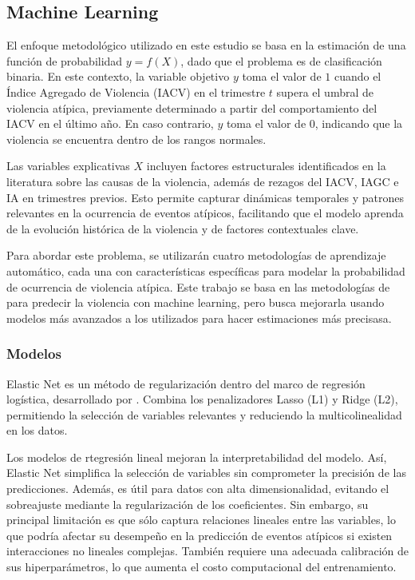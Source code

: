 \subsection*{Machine Learning}
El enfoque metodológico utilizado en este estudio se basa en la estimación de una función de probabilidad \( y = f(X) \), dado que el problema es de {clasificación binaria}. En este contexto, la variable objetivo \( y \) toma el valor de \(1\) cuando el Índice Agregado de Violencia (IACV) en el trimestre \( t \) supera el umbral de violencia atípica, previamente determinado a partir del comportamiento del IACV en el último año. En caso contrario, \( y \) toma el valor de \(0\), indicando que la violencia se encuentra dentro de los rangos normales.

Las variables explicativas \( X \) incluyen factores estructurales identificados en la literatura sobre las causas de la violencia, además de rezagos del IACV, IAGC e IA en trimestres previos. Esto permite capturar {dinámicas temporales} y patrones relevantes en la ocurrencia de eventos atípicos, facilitando que el modelo aprenda de la evolución histórica de la violencia y de factores contextuales clave.

Para abordar este problema, se utilizarán cuatro metodologías de {aprendizaje automático}, cada una con características específicas para modelar la probabilidad de ocurrencia de violencia atípica. Este trabajo se basa en las metodologías de \citet{Bazzi2022} para predecir la violencia con machine learning, pero busca mejorarla usando modelos más avanzados a los utilizados para hacer estimaciones más precisasa.

\subsubsection*{Modelos}


Elastic Net es un método de regularización dentro del marco de {regresión logística}, desarrollado por \citet{ZouHastie2005}. Combina los penalizadores {Lasso (L1)} y {Ridge (L2)}, permitiendo la selección de variables relevantes y reduciendo la multicolinealidad en los datos. 

Los modelos de rtegresión lineal mejoran la interpretabilidad del modelo. Así, Elastic Net simplifica la selección de variables sin comprometer la precisión de las predicciones. Además, es útil para datos con alta dimensionalidad, evitando el sobreajuste mediante la regularización de los coeficientes. Sin embargo, su principal limitación es que sólo captura relaciones lineales entre las variables, lo que podría afectar su desempeño en la predicción de eventos atípicos si existen interacciones no lineales complejas. También requiere una adecuada calibración de sus hiperparámetros, lo que aumenta el costo computacional del entrenamiento.


